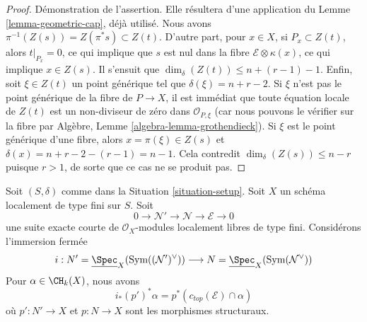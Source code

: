 \begin{proof}
\medskip\noindent
Démonstration de l'assertion. Elle résultera d'une application du
Lemme \ref{lemma-geometric-cap}, déjà utilisé.
Nous avons $\pi^{-1}(Z(s)) = Z(\pi^*s) \subset Z(t)$.
D'autre part, pour $x \in X$, si $P_x \subset Z(t)$, alors
$t|_{P_x} = 0$, ce qui implique que $s$ est nul dans la fibre
$\mathcal{E} \otimes \kappa(x)$, ce qui implique $x \in Z(s)$.
Il s'ensuit que $\dim_\delta(Z(t)) \leq n + (r - 1) - 1$.
Enfin, soit $\xi \in Z(t)$ un point générique tel que
$\delta(\xi) = n + r - 2$. Si $\xi$ n'est pas le point générique
de la fibre de $P \to X$, il est immédiat que
toute équation locale de $Z(t)$ est un non-diviseur de zéro dans $\mathcal{O}_{P, \xi}$
(car nous pouvons le vérifier sur la fibre par
Algèbre, Lemme \ref{algebra-lemma-grothendieck}).
Si $\xi$ est le point générique d'une fibre, alors $x = \pi(\xi) \in Z(s)$
et $\delta(x) = n + r - 2 - (r - 1) = n - 1$. Cela contredit
$\dim_\delta(Z(s)) \leq n - r$ puisque $r > 1$,
de sorte que ce cas ne se produit pas.
\end{proof}

\begin{lemma}
\label{lemma-easy-virtual-class}
Soit $(S, \delta)$ comme dans la Situation \ref{situation-setup}. Soit $X$
un schéma localement de type fini sur $S$. Soit
$$
0 \to \mathcal{N}' \to \mathcal{N} \to \mathcal{E} \to 0
$$
une suite exacte courte de $\mathcal{O}_X$-modules localement libres de type fini.
Considérons l'immersion fermée
$$
i :
N' = \underline{\Spec}_X(\text{Sym}((\mathcal{N}')^\vee))
\longrightarrow
N = \underline{\Spec}_X(\text{Sym}(\mathcal{N}^\vee))
$$
Pour $\alpha \in \CH_k(X)$, nous avons
$$
i_*(p')^*\alpha = p^*(c_{top}(\mathcal{E}) \cap \alpha)
$$
où $p' : N' \to X$ et $p : N \to X$ sont les morphismes structuraux.
\end{lemma}

